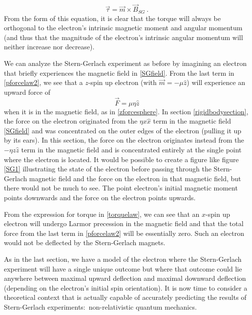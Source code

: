 \documentclass[12pt,secnumarabic,amsmath,amssymb,balancelastpage,nofootinbib]{article}
\begin{document}
\begin{equation}
\vec{\tau}= \vec{m}\times\vec{B}_{SG}
\ .
\label{torquelaw}
\end{equation}
From the form of this equation, it is clear that the torque will always be orthogonal to the electron's intrinsic magnetic moment and angular momentum (and thus that the magnitude of the electron's intrinsic angular momentum will neither increase nor decrease).

We can analyze the Stern-Gerlach experiment as before by imagining an electron that briefly experiences the magnetic field in \eqref{SGfield}.  From the last term in \eqref{pforcelaw2}, we see that a $z$-spin up electron (with $\vec{m}=-\mu\hat{z}$) will experience an upward force of
\begin{equation}
\vec{F}=\mu \eta \hat{z}
\label{zforcepoint}
\end{equation}
when it is in the magnetic field, as in \eqref{zforcesphere}.  In section \ref{rigidbodysection}, the force on the electron originated from the $\eta x \hat{x}$ term in the magnetic field \eqref{SGfield} and was concentrated on the outer edges of the electron (pulling it up by its ears).  In this section, the force on the electron originates instead from the $- \eta z\hat{z}$ term in the magnetic field and is concentrated entirely at the single point where the electron is located.  It would be possible to create a figure like figure \ref{SG1} illustrating the state of the electron before passing through the Stern-Gerlach magnetic field and the force on the electron in that magnetic field, but there would not be much to see.  The point electron's initial magnetic moment points downwards and the force on the electron points upwards.

From the expression for torque in \eqref{torquelaw}, we can see that an $x$-spin up electron will undergo Larmor precession in the magnetic field and that the total force from the last term in \eqref{pforcelaw2} will be essentially zero.  Such an electron would not be deflected by the Stern-Gerlach magnets.

As in the last section, we have a model of the electron where the Stern-Gerlach experiment will have a single unique outcome but where that outcome could lie anywhere between maximal upward deflection and maximal downward deflection (depending on the electron's initial spin orientation).  It is now time to consider a theoretical context that is actually capable of accurately predicting the results of Stern-Gerlach experiments:\ non-relativistic quantum mechanics.
\end{document}
